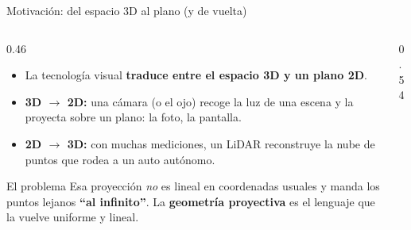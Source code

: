 \documentclass[aspectratio=169]{beamer}
\begin{document}
\begin{frame}{Motivación: del espacio 3D al plano (y de vuelta)}
  \begin{columns}[T]
    \begin{column}{0.46\textwidth}
      \small
      \begin{itemize}
        \item La tecnología visual \textbf{traduce entre el espacio 3D y un
              plano 2D}.
        \item \textbf{3D $\rightarrow$ 2D:} una \alert{cámara} (o el ojo)
              recoge la luz de una escena y la proyecta sobre un plano: la
              foto, la pantalla.
        \item \textbf{2D $\rightarrow$ 3D:} con muchas mediciones, un
              \alert{LiDAR} reconstruye la nube de puntos que rodea a un
              auto autónomo.
      \end{itemize}
      \vspace{0.15cm}
      \begin{block}{El problema}
        Esa proyección \emph{no} es lineal en coordenadas usuales y manda
        los puntos lejanos \textbf{``al infinito''}. La \textbf{geometría
        proyectiva} es el lenguaje que la vuelve uniforme y lineal.
      \end{block}
    \end{column}
    \begin{column}{0.54\textwidth}
      \centering
\end{column}
\end{columns}
\end{frame}
\end{document}
